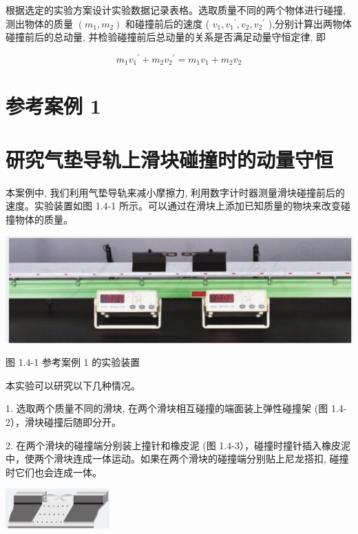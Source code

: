 \documentclass[10pt]{article}
\begin{document}
根据选定的实验方案设计实验数据记录表格。选取质量不同的两个物体进行碰撞,测出物体的质量 \(\left( {{m}_{1},{m}_{2}}\right)\) 和碰撞前后的速度 ( \({v}_{1},{v}_{1}{}^{\prime },{v}_{2},{v}_{2}{}^{\prime }\) ),分别计算出两物体碰撞前后的总动量, 并检验碰撞前后总动量的关系是否满足动量守恒定律, 即

\[
{m}_{1}{v}_{1}{}^{\prime } + {m}_{2}{v}_{2}{}^{\prime } = {m}_{1}{v}_{1} + {m}_{2}{v}_{2}
\]

\section*{参考案例 1}

\section*{研究气垫导轨上滑块碰撞时的动量守恒}

本案例中, 我们利用气垫导轨来减小摩擦力, 利用数字计时器测量滑块碰撞前后的速度。实验装置如图 1.4-1 所示。可以通过在滑块上添加已知质量的物块来改变碰撞物体的质量。

\begin{center}
\includegraphics[max width=1.0\textwidth]{images/01910e4c-ebb8-7d2c-8f2f-2375bc1d2d12_23_997793.jpg}
\end{center}

图 1.4-1 参考案例 1 的实验装置

本实验可以研究以下几种情况。

1. 选取两个质量不同的滑块, 在两个滑块相互碰撞的端面装上弹性碰撞架 (图 1.4-2），滑块碰撞后随即分开。

2. 在两个滑块的碰撞端分别装上撞针和橡皮泥 (图 1.4-3），碰撞时撞针插入橡皮泥中，使两个滑块连成一体运动。如果在两个滑块的碰撞端分别贴上尼龙搭扣, 碰撞时它们也会连成一体。

\begin{center}
\includegraphics[max width=0.3\textwidth]{images/01910e4c-ebb8-7d2c-8f2f-2375bc1d2d12_24_482409.jpg}
\end{center}
\end{document}
